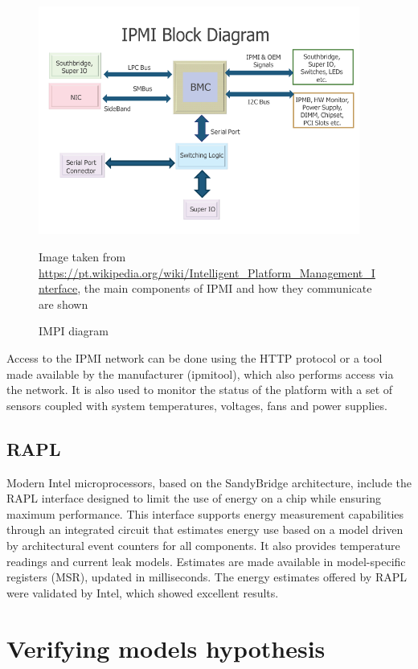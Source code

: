 \begin {figure} [H]
\centering
\includegraphics [height = 7.5cm] {intro/figures/IPMI-Block-Diagram.png}
\caption {IMPI diagram} {Image taken from \protect \url {https://pt.wikipedia.org/wiki/Intelligent_Platform_Management_Interface}, the main components of IPMI and how they communicate are shown}
\label {fig: IPMI}
\end {figure}

Access to the IPMI network can be done using the HTTP protocol or a tool made available by the manufacturer (ipmitool), which also performs access via the network. It is also used to monitor the status of the platform with a set of sensors coupled with system temperatures, voltages, fans and power supplies.

\subsection {RAPL}

Modern Intel microprocessors, based on the SandyBridge architecture, include the RAPL \cite {Rotem2012, Hahnel2012, Hackenberg2015} interface designed to limit the use of energy on a chip while ensuring maximum performance. This interface supports energy measurement capabilities through an integrated circuit that estimates energy use based on a model driven by architectural event counters for all components. It also provides temperature readings and current leak models. Estimates are made available in model-specific registers (MSR), updated in milliseconds. The energy estimates offered by RAPL were validated by Intel, which showed excellent results.


\section{Verifying models hypothesis}

